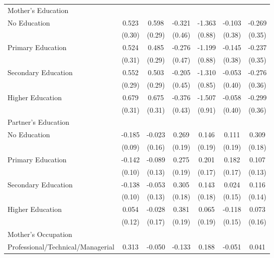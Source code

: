 \begin{longtable}{l*{6}{c}}
\multicolumn{7}{l}{Mother's Education} \\
\hspace{1em}No Education & 0.523\sym{*} & 0.598\sym{**} & -0.321 & -1.363 & -0.103 & -0.269 \\
                    & (0.30) & (0.29) & (0.46) & (0.88) & (0.38) & (0.35) \\
\hspace{1em}Primary Education & 0.524\sym{*} & 0.485\sym{*} & -0.276 & -1.199 & -0.145 & -0.237 \\
                    & (0.31) & (0.29) & (0.47) & (0.88) & (0.38) & (0.35) \\
\hspace{1em}Secondary Education & 0.552\sym{*} & 0.503\sym{*} & -0.205 & -1.310 & -0.053 & -0.276 \\
                    & (0.29) & (0.29) & (0.45) & (0.85) & (0.40) & (0.36) \\
\hspace{1em}Higher Education & 0.679\sym{**} & 0.675\sym{**} & -0.376 & -1.507 & -0.058 & -0.299 \\
                    & (0.31) & (0.31) & (0.43) & (0.91) & (0.40) & (0.36) \\
\multicolumn{7}{l}{Partner's Education} \\
\hspace{1em}No Education & -0.185\sym{**} & -0.023 & 0.269 & 0.146 & 0.111 & 0.309\sym{*} \\
                    & (0.09) & (0.16) & (0.19) & (0.19) & (0.19) & (0.18) \\
\hspace{1em}Primary Education & -0.142 & -0.089 & 0.275 & 0.201 & 0.182 & 0.107 \\
                    & (0.10) & (0.13) & (0.19) & (0.17) & (0.17) & (0.13) \\
\hspace{1em}Secondary Education & -0.138 & -0.053 & 0.305\sym{*} & 0.143 & 0.024 & 0.116 \\
                    & (0.10) & (0.13) & (0.18) & (0.18) & (0.15) & (0.14) \\
\hspace{1em}Higher Education & 0.054 & -0.028 & 0.381\sym{*} & 0.065 & -0.118 & 0.073 \\
                    & (0.12) & (0.17) & (0.19) & (0.19) & (0.15) & (0.16) \\
\multicolumn{7}{l}{Mother's Occupation} \\
\hspace{1em}Professional/Technical/Managerial & 0.313\sym{***} & -0.050 & -0.133 & 0.188 & -0.051 & 0.041 \\

\end{longtable}
